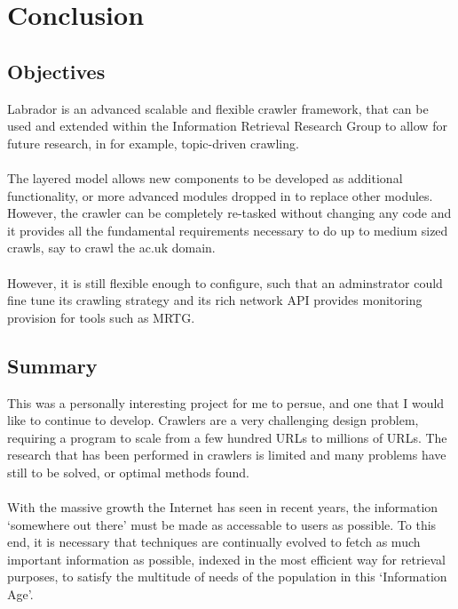 \chapter{Conclusion}

\section{Objectives}
Labrador is an advanced scalable and flexible crawler framework, that can be used and extended within the Information Retrieval Research Group to allow for future research, in for example, topic-driven crawling.\\
\ \\
The layered model allows new components to be developed as additional functionality, or more advanced modules dropped in to replace other modules. However, the crawler can be completely re-tasked without changing any code and it provides all the fundamental requirements necessary to do up to medium sized crawls, say to crawl the ac.uk domain.\\
\ \\
However, it is still flexible enough to configure, such that an adminstrator could fine tune its crawling strategy and its rich network API provides monitoring provision for tools such as MRTG.
\section{Summary}
This was a personally interesting project for me to persue, and one that I would like to continue to develop. Crawlers are a very challenging design problem, requiring a program to scale from a few hundred URLs to millions of URLs. The research that has been performed in crawlers is limited and many problems have still to be solved, or optimal methods found.\\
\ \\
With the massive growth the Internet has seen in recent years, the information `somewhere out there' must be made as accessable to users as possible. To this end, it is necessary that techniques are continually evolved to fetch as much important information as possible, indexed in the most efficient way for retrieval purposes, to satisfy the multitude of needs of the population in this `Information Age'.
